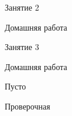 \begin{homework}[number=3]
	\begin{listofex}
		\item 
	\end{listofex}
\end{homework}

\begin{class}[number=5]
	\begin{listofex}
		\item Занятие 2
	\end{listofex}
\end{class}

\begin{homework}[number=2]
	\begin{listofex}
		\item Домашняя работа
	\end{listofex}
\end{homework}

\begin{class}[number=3]
	\begin{listofex}
		\item Занятие 3
	\end{listofex}
\end{class}

\begin{homework}[number=3]
	\begin{listofex}
		\item Домашняя работа
	\end{listofex}
\end{homework}

\begin{class}[number=4]
	\begin{listofex}
		\item Пусто
	\end{listofex}
\end{class}


\begin{exam}
	\begin{listofex}
		\item Проверочная
	\end{listofex}
\end{exam}
